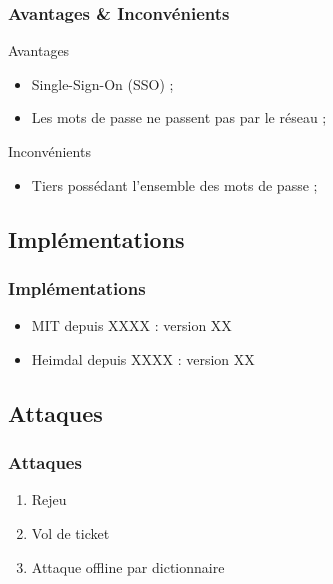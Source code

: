 \documentclass[svgnames]{beamer}
\begin{document}
\begin{frame}
 \frametitle{Avantages \& Inconvénients}
 
 
 \begin{exampleblock}{Avantages}
  \begin{itemize}
   \item Single-Sign-On (SSO) ;
   \item Les mots de passe ne passent pas par le réseau ;
  \end{itemize}
 \end{exampleblock}
 
 \pause
 
 \begin{alertblock}{Inconvénients}
  \begin{itemize}
   \item Tiers possédant l'ensemble des mots de passe ;
  \end{itemize}
 \end{alertblock}
\end{frame}

\subsection{Implémentations}

\begin{frame}
  \frametitle{Implémentations}
  
  \begin{itemize}
   \item MIT depuis XXXX : version XX %
   \item Heimdal depuis XXXX : version XX %
  \end{itemize}
  
  
\end{frame}


\subsection{Attaques}

\begin{frame}
 \frametitle{Attaques}
 
 \begin{enumerate}
  \item Rejeu
  \item Vol de ticket
  \item Attaque offline par dictionnaire
 \end{enumerate}

\end{frame}
\end{document}
